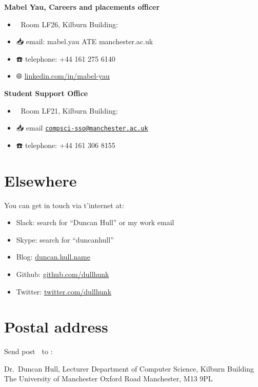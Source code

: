 \documentclass[12pt,]{book}
\providecommand{\tightlist}{%
  \setlength{\itemsep}{0pt}\setlength{\parskip}{0pt}}
\begin{document}
\textbf{Mabel Yau, Careers and placements officer} 👩‍💻

\begin{itemize}
\tightlist
\item
  🏢 Room LF26, Kilburn Building:
\item
  📥 email: mabel.yau ATE manchester.ac.uk
\item
  ☎️ telephone: +44 161 275 6140
\item
  🌐 \href{https://uk.linkedin.com/in/mabel-yau}{linkedin.com/in/mabel-yau}
\end{itemize}

\textbf{Student Support Office } 👨‍👩‍👧‍👦

\begin{itemize}
\tightlist
\item
  🏢 Room LF21, Kilburn Building:
\item
  📥 email \href{mailto:compsci-sso@manchester.ac.uk}{\nolinkurl{compsci-sso@manchester.ac.uk}}
\item
  ☎️ telephone: +44 161 306 8155
\end{itemize}

\hypertarget{elsewhere}{%
\section{Elsewhere}\label{elsewhere}}

You can get in touch via t'internet at:

\begin{itemize}
\tightlist
\item
  Slack: search for ``Duncan Hull'' or my work email
\item
  Skype: search for ``duncanhull''
\item
  Blog: \href{https://duncan.hull.name}{duncan.hull.name}
\item
  Github: \href{https://github.com/dullhunk}{github.com/dullhunk}
\item
  Twitter: \href{https://twitter.com/dullhunk}{twitter.com/dullhunk}
\end{itemize}

\hypertarget{postal-address}{%
\section{Postal address}\label{postal-address}}

Send post 🐌 to :

Dr.~Duncan Hull, Lecturer
Department of Computer Science, Kilburn Building
The University of Manchester
Oxford Road
Manchester, M13 9PL
\end{document}
